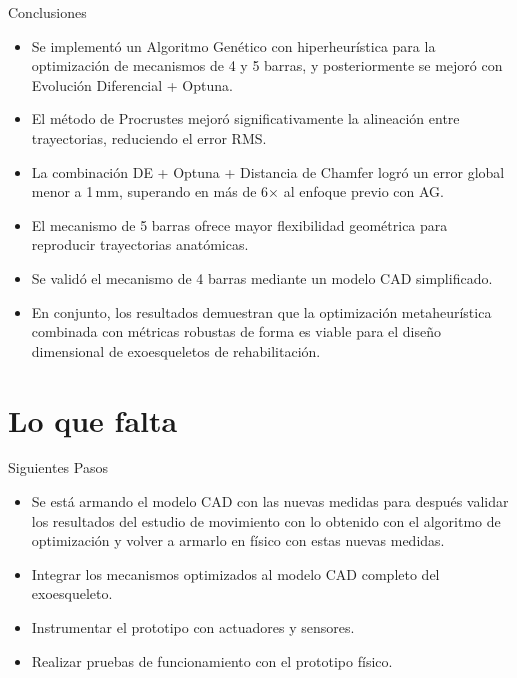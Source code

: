 \documentclass[xcolor={table,dvipsnames}]{beamer}
\begin{document}
\begin{frame}{Conclusiones}
    \begin{itemize}
        \item Se implement\'o un Algoritmo Gen\'etico con hiperheur\'istica para la optimizaci\'on de mecanismos de 4 y 5 barras, y posteriormente se mejor\'o con Evoluci\'on Diferencial + Optuna.
        \item El m\'etodo de Procrustes mejor\'o significativamente la alineaci\'on entre trayectorias, reduciendo el error RMS.
        \item La combinaci\'on DE + Optuna + Distancia de Chamfer logr\'o un error global menor a 1\,mm, superando en m\'as de 6$\times$ al enfoque previo con AG.
        \item El mecanismo de 5 barras ofrece mayor flexibilidad geom\'etrica para reproducir trayectorias anat\'omicas.
        \item Se valid\'o el mecanismo de 4 barras mediante un modelo CAD simplificado.
        \item En conjunto, los resultados demuestran que la optimizaci\'on metaheur\'istica combinada con m\'etricas robustas de forma es viable para el dise\~no dimensional de exoesqueletos de rehabilitaci\'on.
    \end{itemize}
\end{frame}

\section{Lo que falta}

\begin{frame}{Siguientes Pasos}
    \begin{itemize}
        \item Se est\'a armando el modelo CAD con las nuevas medidas para despu\'es validar los resultados del estudio de movimiento con lo obtenido con el algoritmo de optimizaci\'on y volver a armarlo en f\'isico con estas nuevas medidas.
        \item Integrar los mecanismos optimizados al modelo CAD completo del exoesqueleto.
        \item Instrumentar el prototipo con actuadores y sensores.
        \item Realizar pruebas de funcionamiento con el prototipo f\'isico.
    \end{itemize}
\end{frame}
\end{document}
